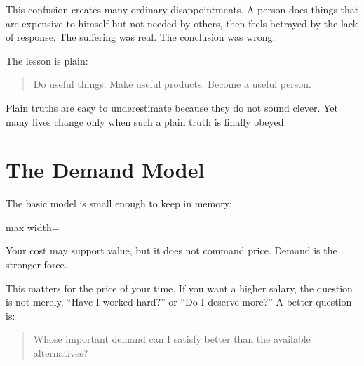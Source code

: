This confusion creates many ordinary disappointments. A person does things that are expensive to himself but not needed by others, then feels betrayed by the lack of response. The suffering was real. The conclusion was wrong.

The lesson is plain:

\begin{quote}
Do useful things. Make useful products. Become a useful person.
\end{quote}

Plain truths are easy to underestimate because they do not sound clever. Yet many lives change only when such a plain truth is finally obeyed.

\section*{The Demand Model}

The basic model is small enough to keep in memory:

\begin{center}
\begin{adjustbox}{max width=\linewidth}
\end{adjustbox}
\end{center}

Your cost may support value, but it does not command price. Demand is the stronger force.

This matters for the price of your time. If you want a higher salary, the question is not merely, ``Have I worked hard?'' or ``Do I deserve more?'' A better question is:

\begin{quote}
Whose important demand can I satisfy better than the available alternatives?
\end{quote}

